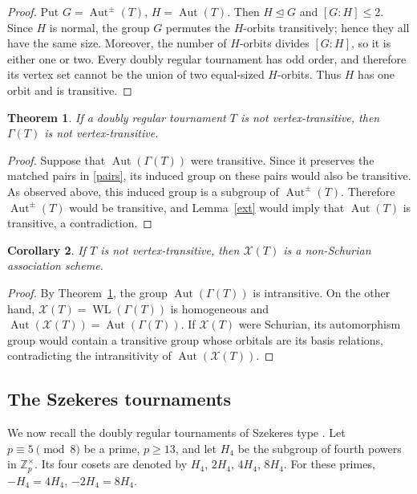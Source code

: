 \documentclass[11pt]{article}
\newtheorem{theorem}{Theorem}[section]
\newtheorem{corollary}[theorem]{Corollary}
\theoremstyle{definition}
\theoremstyle{remark}
\DeclareMathOperator{\Aut}{Aut}
\begin{document}
\begin{proof}
Put $ G=\Aut^{\pm}(T)$, $ H=\Aut(T).$
Then $H\trianglelefteq G$ and $[G:H]\leq2$.  Since $H$ is normal, the group
$G$ permutes the $H$-orbits transitively; hence they all have the same size.
Moreover, the number of $H$-orbits divides $[G:H]$, so it is either one or
two.  Every doubly regular tournament has odd order, and therefore its vertex set cannot be
the union of two equal-sized $H$-orbits.  Thus $H$ has one orbit and is
transitive.
\end{proof}

\begin{theorem}
\label{intrans}
If a doubly regular tournament $T$ is not vertex-transitive, then
$\Gamma(T)$ is not vertex-transitive.
\end{theorem}

\begin{proof}
Suppose that $\Aut(\Gamma(T))$ were transitive.  Since it preserves the
matched pairs in \eqref{pairs}, its induced group on these
pairs would also be transitive.  As observed above, this induced group is a
subgroup of $\Aut^{\pm}(T)$.  Therefore $\Aut^{\pm}(T)$ would be transitive,
and Lemma~\ref{ext} would imply that $\Aut(T)$ is
transitive, a contradiction.
\end{proof}

\begin{corollary}
\label{nsc}
If $T$ is not vertex-transitive, then $\mathcal X(T)$ is a non-Schurian
association scheme.
\end{corollary}

\begin{proof}
By Theorem~\ref{intrans}, the group
$\Aut(\Gamma(T))$ is intransitive.  On the other hand,
$\mathcal X(T)=\operatorname{WL}(\Gamma(T))$ is homogeneous and
$ \Aut(\mathcal X(T))=\Aut(\Gamma(T))$.
If $\mathcal X(T)$ were Schurian, its automorphism group would contain a
transitive group whose orbitals are its basis relations, contradicting the
intransitivity of $\Aut(\mathcal X(T))$.
\end{proof}

\subsection{The Szekeres tournaments}

We now recall the doubly regular tournaments of Szekeres type
\cite{ito,sz}.  Let $p\equiv5\pmod8$ be a prime, $p\geq13$,
and let $H_4$ be the subgroup of fourth powers in
$\mathbb Z_p^{\times}$.  Its four cosets are denoted by
$H_4$, $2H_4$, $4H_4$, $8H_4$.
For these primes, $-H_4=4H_4$, $-2H_4=8H_4$.
\end{document}
